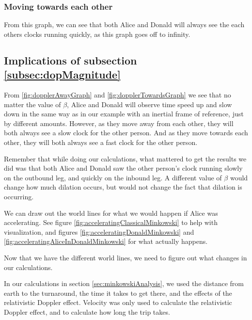 		\subsubsection{Moving towards each other}
			
			From this graph, we can see that both Alice and Donald will always see the each others clocks running quickly, as this graph goes off to infinity.
	\subsection{Implications of subsection \ref{subsec:dopMagnitude}}
		From \ref{fig:dopplerAwayGraph} and \vref{fig:dopplerTowardsGraph} we see that no matter the value of $\beta$, Alice and Donald will observe time speed up and slow down in the same way as in our example with an inertial frame of reference, just by different amounts.
		However, as they move away from each other, they will both always see a slow clock for the other person.
		And as they move towards each other, they will both always see a fast clock for the other person.

		Remember that while doing our calculations, what mattered to get the results we did was that both Alice and Donald saw the other person's clock running slowly on the outbound leg, and quickly on the inbound leg. A different value of $\beta$ would change how much dilation occurs, but would not change the fact that dilation is occurring.

		We can draw out the world lines for what we would happen if Alice was accelerating. See figure \vref{fig:acceleratingClassicalMinkowski} to help with visualization, and figures \ref{fig:acceleratingDonaldMinkowski} and \vref{fig:acceleratingAliceInDonaldMinkowski} for what actually happens.
		
		
		
		\newpage
		Now that we have the different world lines, we need to figure out what changes in our calculations.

		In our calculations in section \vref{sec:minkowskiAnalysis}, we used the distance from earth to the turnaround, the time it takes to get there, and the effects of the relativistic Doppler effect. Velocity was only used to calculate the relativistic Doppler effect, and to calculate how long the trip takes.

